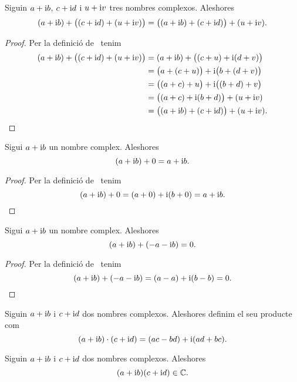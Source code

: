 \documentclass[../Apunts.tex]{subfiles}
\begin{document}
	\begin{proposition}
		\label{prop:els nombres complexos són associatius per la suma}
		Siguin \(a+\mathrm{i} b\), \(c+\mathrm{i} d\) i \(u+\mathrm{i} v\) tres nombres complexos. Aleshores
		\[(a+\mathrm{i} b)+\big((c+\mathrm{i} d)+(u+\mathrm{i} v)\big)=\big((a+\mathrm{i} b)+(c+\mathrm{i} d)\big)+(u+\mathrm{i} v).\]
		\begin{proof}
			Per la definició de~ tenim
			\begin{align*}
				(a+\mathrm{i} b)+\big((c+\mathrm{i} d)+(u+\mathrm{i} v)\big)&=(a+\mathrm{i} b)+\big((c+u)+\mathrm{i}(d+v)\big) \\
				&=\big(a+(c+u)\big)+\mathrm{i}\big(b+(d+v)\big) \\
				&=\big((a+c)+u\big)+\mathrm{i}\big((b+d)+v\big) \\
				&=\big((a+c)+\mathrm{i}(b+d)\big)+(u+\mathrm{i} v) \\
				&=\big((a+\mathrm{i} b)+(c+\mathrm{i} d)\big)+(u+\mathrm{i} v).\qedhere
			\end{align*}
		\end{proof}
	\end{proposition}
	\begin{proposition}
		\label{prop:element neutre per la suma dels complexos}
		Sigui \(a+\mathrm{i} b\) un nombre complex. Aleshores
		\[(a+\mathrm{i} b)+0=a+\mathrm{i} b.\]
		\begin{proof}
			Per la definició de~\myref{def:suma de nombres complexos} tenim
			\[(a+\mathrm{i} b)+0=(a+0)+\mathrm{i}(b+0)=a+\mathrm{i} b.\qedhere\]
		\end{proof}
	\end{proposition}
	\begin{proposition}
		\label{prop:element invers per la suma dels complexos}
		Sigui \(a+\mathrm{i} b\) un nombre complex. Aleshores
		\[(a+\mathrm{i} b)+(-a-\mathrm{i} b)=0.\]
		\begin{proof}
			Per la definició de~ tenim
			\[(a+\mathrm{i} b)+(-a-\mathrm{i} b)=(a-a)+\mathrm{i}(b-b)=0.\qedhere\]
		\end{proof}
	\end{proposition}
	\begin{definition}
		\label{def:producte de nombres complexos}
		Siguin \(a+\mathrm{i} b\) i \(c+\mathrm{i} d\) dos nombres complexos. Aleshores definim el seu producte com
		\[(a+\mathrm{i} b)\cdot(c+\mathrm{i} d)=(ac-bd)+\mathrm{i}(ad+bc).\]
	\end{definition}
	\begin{observation}
		\label{obs:els nombres complexos estan tancats pel producte}
		Siguin \(a+\mathrm{i} b\) i \(c+\mathrm{i} d\) dos nombres complexos. Aleshores
		\[(a+\mathrm{i} b)(c+\mathrm{i} d)\in\mathbb{C}.\]
	\end{observation}
\end{document}

